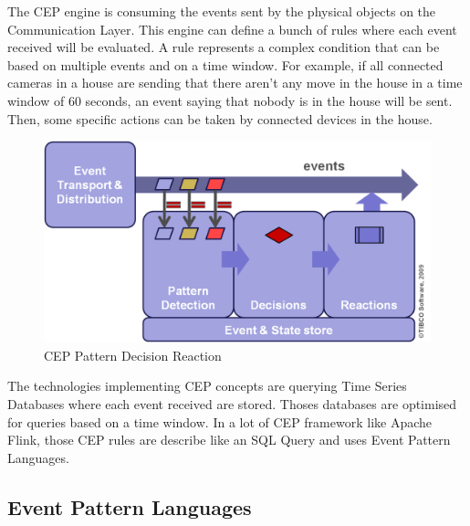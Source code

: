 \documentclass[11pt]{article}
\begin{document}
The CEP engine is consuming the events sent by the physical objects on the Communication Layer. This engine can define a bunch of rules where each event received will be evaluated. A rule represents a complex condition that can be based on multiple events and on a time window. For example, if all connected cameras in a house are sending that there aren't any move in the house in a time window of 60 seconds, an event saying that nobody is in the house will be sent. Then, some specific actions can be taken by connected devices in the house. 
\newline
\begin{figure}[h]
	\includegraphics[scale=0.6]{assets/cep-pattern-decision-reaction.png} 
	\caption{CEP Pattern Decision Reaction}
	\label{fig:cep-pattern-decision-reaction}
\end{figure}

The technologies implementing CEP concepts are querying Time Series Databases where each event received are stored. Thoses databases are optimised for queries based on a time window. In a lot of CEP framework like Apache Flink, those CEP rules are describe like an SQL Query and uses Event Pattern Languages. 

\subsection{Event Pattern Languages}
\end{document}

